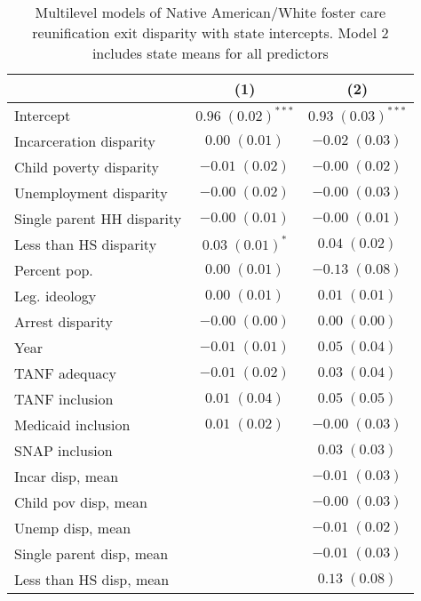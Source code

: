 
\begin{table}
\caption{Multilevel models of Native American/White foster care reunification exit disparity with state intercepts. Model 2 includes state means for all predictors }
\begin{center}
\begin{tabular}{l c c }
\hline
 & (1) & (2) \\
\hline
Intercept                  & $0.96 \; (0.02)^{***}$ & $0.93 \; (0.03)^{***}$ \\
Incarceration disparity    & $0.00 \; (0.01)$       & $-0.02 \; (0.03)$      \\
Child poverty disparity    & $-0.01 \; (0.02)$      & $-0.00 \; (0.02)$      \\
Unemployment disparity     & $-0.00 \; (0.02)$      & $-0.00 \; (0.03)$      \\
Single parent HH disparity & $-0.00 \; (0.01)$      & $-0.00 \; (0.01)$      \\
Less than HS disparity     & $0.03 \; (0.01)^{*}$   & $0.04 \; (0.02)$       \\
Percent pop.               & $0.00 \; (0.01)$       & $-0.13 \; (0.08)$      \\
Leg. ideology              & $0.00 \; (0.01)$       & $0.01 \; (0.01)$       \\
Arrest disparity           & $-0.00 \; (0.00)$      & $0.00 \; (0.00)$       \\
Year                       & $-0.01 \; (0.01)$      & $0.05 \; (0.04)$       \\
TANF adequacy              & $-0.01 \; (0.02)$      & $0.03 \; (0.04)$       \\
TANF inclusion             & $0.01 \; (0.04)$       & $0.05 \; (0.05)$       \\
Medicaid inclusion         & $0.01 \; (0.02)$       & $-0.00 \; (0.03)$      \\
SNAP inclusion             &                        & $0.03 \; (0.03)$       \\
Incar disp, mean           &                        & $-0.01 \; (0.03)$      \\
Child pov disp, mean       &                        & $-0.00 \; (0.03)$      \\
Unemp disp, mean           &                        & $-0.01 \; (0.02)$      \\
Single parent disp, mean   &                        & $-0.01 \; (0.03)$      \\
Less than HS disp, mean    &                        & $0.13 \; (0.08)$       \\

\end{tabular}
\end{center}
\end{table}
